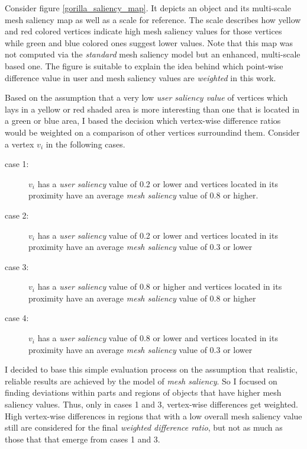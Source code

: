 Consider figure \ref{gorilla_saliency_map}. It depicts an object and its multi-scale mesh saliency map as well as a scale for reference. The scale describes how yellow and red colored vertices indicate high mesh saliency values for those vertices while green and blue colored ones suggest lower values. Note that this map was not computed via the \textit{standard} mesh saliency model but an enhanced, multi-scale based one. The figure is suitable to explain the idea behind which point-wise difference value in user and mesh saliency values are \textit{weighted} in this work.

Based on the assumption that a very low \textit{user saliency value} of vertices which lays in a yellow or red shaded area is more interesting than one that is located in a green or blue area, I based the decision which vertex-wise difference ratios would be weighted on a comparison of other vertices surroundind them. Consider a vertex $v_i$ in the following cases.

\begin{description}
	\item [case 1:] $v_i$ has a \textit{user saliency} value of 0.2 or lower and vertices located in its proximity have an average \textit{mesh saliency} value of 0.8 or higher.
	\item [case 2:] $v_i$ has a \textit{user saliency} value of 0.2 or lower and vertices located in its proximity have an average \textit{mesh saliency} value of 0.3 or lower
	\item [case 3:] $v_i$ has a \textit{user saliency} value of 0.8 or higher and vertices located in its proximity have an average \textit{mesh saliency} value of 0.8 or higher
	\item [case 4:] $v_i$ has a \textit{user saliency} value of 0.8 or lower and vertices located in its proximity have an average \textit{mesh saliency} value of 0.3 or lower
\end{description}

I decided to base this simple evaluation process on the assumption that realistic, reliable results are achieved by the model of \textit{mesh saliency}. So I focused on finding deviations within parts and regions of objects that have higher mesh saliency values. Thus, only in cases 1 and 3, vertex-wise differences get weighted. High vertex-wise differences in regions that with a low overall mesh saliency value still are considered for the final \textit{weighted difference ratio}, but not as much as those that that emerge from cases 1 and 3.

